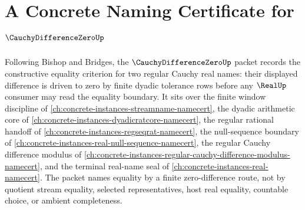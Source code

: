 \chapter{A Concrete Naming Certificate for $\CauchyDifferenceZeroUp$}
\label{ch:concrete-instances-cauchy-difference-zero-namecert}

Following Bishop and Bridges, the $\CauchyDifferenceZeroUp$ packet records the constructive equality criterion for two regular Cauchy real names: their displayed difference is driven to zero by finite dyadic tolerance rows before any $\RealUp$ consumer may read the equality boundary. It sits over the finite window discipline of \autoref{ch:concrete-instances-streamname-namecert}, the dyadic arithmetic core of \autoref{ch:concrete-instances-dyadicratcore-namecert}, the regular rational handoff of \autoref{ch:concrete-instances-regseqrat-namecert}, the null-sequence boundary of \autoref{ch:concrete-instances-real-null-sequence-namecert}, the regular Cauchy difference modulus of \autoref{ch:concrete-instances-regular-cauchy-difference-modulus-namecert}, and the terminal real-name seal of \autoref{ch:concrete-instances-real-namecert}. The packet names equality by a finite zero-difference route, not by quotient stream equality, selected representatives, host real equality, countable choice, or ambient completeness.

